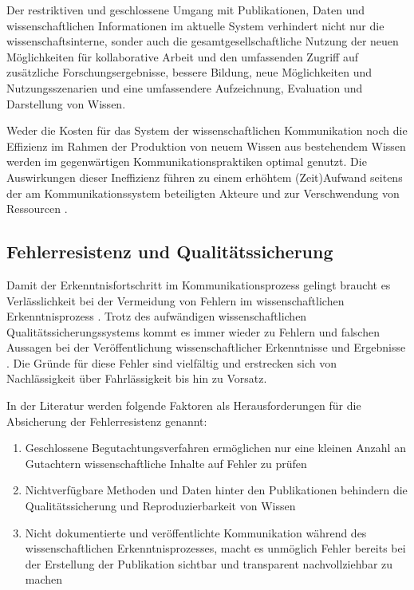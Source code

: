 Der restriktiven und geschlossene Umgang mit Publikationen, Daten und wissenschaftlichen Informationen im aktuelle System verhindert nicht nur die wissenschaftsinterne, sonder auch die gesamtgesellschaftliche Nutzung der neuen Möglichkeiten für kollaborative Arbeit und den umfassenden Zugriff auf zusätzliche Forschungsergebnisse, bessere Bildung, neue Möglichkeiten und Nutzungsszenarien und eine umfassendere Aufzeichnung, Evaluation und Darstellung von Wissen.

Weder die Kosten für das System der wissenschaftlichen Kommunikation noch die Effizienz im Rahmen der Produktion von neuem Wissen aus bestehendem Wissen werden im gegenwärtigen Kommunikationspraktiken optimal genutzt. Die Auswirkungen dieser Ineffizienz führen zu einem erhöhtem (Zeit)Aufwand seitens der am Kommunikationssystem beteiligten Akteure und zur Verschwendung von Ressourcen \cite{nosek_2012_scientific}.

\subsection{Fehlerresistenz und Qualitätssicherung}

Damit der Erkenntnisfortschritt im Kommunikationsprozess gelingt braucht es Verlässlichkeit bei der Vermeidung von Fehlern im wissenschaftlichen Erkenntnisprozess \cite{Bargheer_2015}. Trotz des aufwändigen wissenschaftlichen Qualitätssicherungssystems kommt es immer wieder zu Fehlern und falschen Aussagen bei der Veröffentlichung wissenschaftlicher Erkenntnisse und Ergebnisse \cite{brembs2015open} \cite{Luescher_2014}. Die Gründe für diese Fehler sind vielfältig und erstrecken sich von Nachlässigkeit über Fahrlässigkeit bis hin zu Vorsatz.

In der Literatur werden folgende Faktoren als Herausforderungen für die Absicherung der Fehlerresistenz genannt:
\begin{enumerate}
\item Geschlossene Begutachtungsverfahren ermöglichen nur eine kleinen Anzahl an Gutachtern wissenschaftliche Inhalte auf Fehler zu prüfen \cite{suchen}
\item Nichtverfügbare Methoden und Daten hinter den Publikationen behindern die Qualitätssicherung und Reproduzierbarkeit von Wissen \cite{Nosek_2015}
\item Nicht dokumentierte und veröffentlichte Kommunikation während des wissenschaftlichen Erkenntnisprozesses, macht es unmöglich Fehler bereits bei der Erstellung der Publikation sichtbar und transparent nachvollziehbar zu machen \cite{Nosek_2015}
\end{enumerate}

